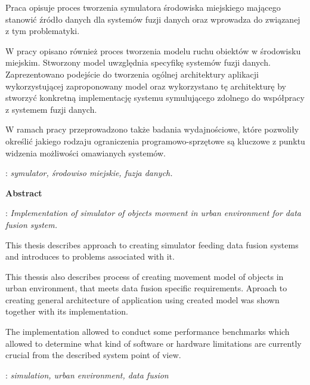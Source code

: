 \begin{titlepage}
    {\itshape
    \par{
    Praca opisuje proces tworzenia symulatora środowiska miejskiego mającego stanowić źródło danych dla systemów fuzji danych oraz wprowadza do związanej z tym problematyki.
	}    
    \par{
	W pracy opisano również proces tworzenia modelu ruchu obiektów w środowisku miejskim. Stworzony model uwzględnia specyfikę systemów fuzji danych. Zaprezentowano podejście do tworzenia ogólnej architektury aplikacji wykorzystującej zaproponowany model oraz wykorzystano tę architekturę by stworzyć konkretną implementację systemu symulującego zdolnego do współpracy z systemem fuzji danych.
	}
	\par{
	W ramach pracy przeprowadzono także badania wydajnościowe, które pozwoliły określić jakiego rodzaju ograniczenia programowo-sprzętowe są kluczowe z punktu widzenia możliwości omawianych systemów.
	}
    }
    \vspace*{1\baselineskip}

    : {\itshape symulator, środowiso miejskie, fuzja danych.}
    \par
    \vspace{4\baselineskip}
    \begin{center}
	{\large\bfseries Abstract}\par\bigskip
    \end{center}
    : {\itshape Implementation of simulator of objects movment in urban environment for data fusion system.
    }\par
    \vspace*{1\baselineskip}
    {\itshape
    \par{
    This thesis describes approach to creating simulator feeding data fusion systems and introduces to problems associated with it.
	}
    \par{
    This thessis also describes process of creating movement model of objects in urban environment, that meets data fusion specific requirements. Aproach to creating general architecture of application using created model was shown together with its implementation.
	}
	\par{
	The implementation allowed to conduct some performance benchmarks which allowed to determine what kind of software or hardware limitations are currently crucial from the described system point of view.
	}
    }
    \vspace*{1\baselineskip}

    : {\itshape simulation, urban environment, data fusion}

\end{titlepage}

